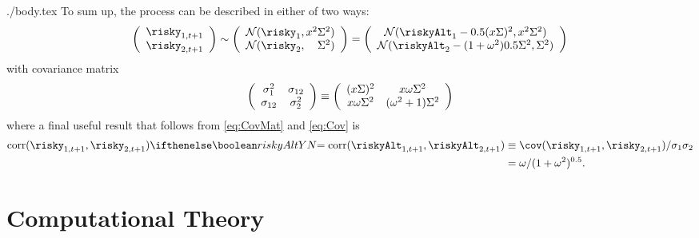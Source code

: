 \documentclass{handout}
\begin{document}
\begin{verbatimwrite}{./body.tex}
To sum up, the process can be described in either of two ways:
\begin{equation*}
 \left(\begin{array}{c}\risky_{1,t+1} \\ \risky_{2,t+1} \end{array}\right) \sim \left(\begin{array}{c}\mathcal{N}(\risky_{1},\scale^{2} \sigAll^{2}) \\ \mathcal{N}(\risky_{2}, \phantom{\scale^{2}} \sigAll^{2}) \end{array}\right) = \left(\begin{array}{c}\mathcal{N}(\riskyAlt_{1}-0.5(\scale\sigAll)^{2},\scale^{2} \sigAll^{2}) \\ \mathcal{N}(\riskyAlt_{2} - (1+\omega^{2})0.5 \sigAll^{2}, \sigAll^{2}) \end{array}\right) 
\end{equation*}
with covariance matrix
\begin{equation}
\left(\begin{array}{ccc}\sigma_1^2 & \sigma_{12} \\ \sigma_{12}& \sigma_2^2\end{array}\right) \equiv \left(\begin{array}{ccc}(x \Sigma)^2 & x \omega \Sigma^{2} \\ x \omega \Sigma^{2}  & (\omega^{2}+1)\Sigma^{2}\end{array}\right) \label{eq:CovMat}
\end{equation}
where a final useful result that follows from \eqref{eq:CovMat} and \eqref{eq:Cov} is 
\begin{equation}\begin{gathered}\begin{aligned}
 \text{corr}({\risky}_{1,t+1} ,{\risky}_{2,t+1}) \ifriskyAlt{= \text{corr}(\riskyAlt_{1,t+1} ,\riskyAlt_{2,t+1})}{} & \equiv  \cov({\risky}_{1,t+1} ,{\risky}_{2,t+1})/\sigma_{1}\sigma_{2}
\\ & =  \omega/(1+\omega^{2})^{0.5} .
\end{aligned}\end{gathered}\end{equation}

\section{Computational Theory}


\end{verbatimwrite}
\end{document}
